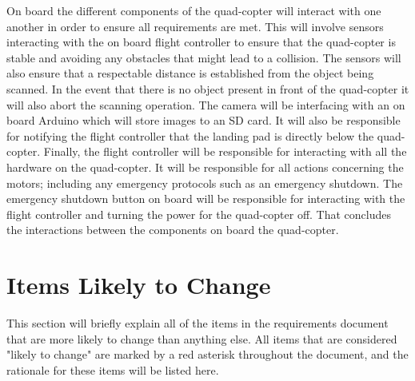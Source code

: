 \documentclass[10pt,letterpaper]{article}
\begin{document}

On board the different components of the quad-copter will interact with one another in order to ensure all requirements are met. This will involve sensors interacting with the on board flight controller to ensure that the quad-copter is stable and avoiding any obstacles that might lead to a collision. The sensors will also ensure that a respectable distance is established from the object being scanned. In the event that there is no object present in front of the quad-copter it will also abort the scanning operation. The camera will be interfacing with an on board Arduino which will store images to an SD card. It will also be responsible for notifying the flight controller that the landing pad is directly below the quad-copter. Finally, the flight controller will be responsible for interacting with all the hardware on the quad-copter. It will be responsible for all actions concerning the motors; including any emergency protocols such as an emergency shutdown. The emergency shutdown button on board will be responsible for interacting with the flight controller and turning the power for the quad-copter off. That concludes the interactions between the components on board the quad-copter.\par
\par 

\section{Items Likely to Change}
This section will briefly explain all of the items in the requirements document that are more likely to change than anything else. All items that are considered "likely to change" are marked by a red asterisk throughout the document, and the rationale for these items will be listed here.\par
\end{document}
